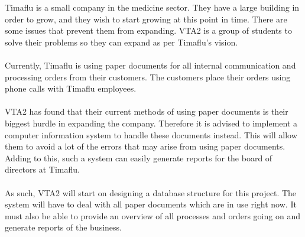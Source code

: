 \documentclass[11pt,english]{article}
\begin{document}
Timaflu is a small company in the medicine sector. They have a large building in
order to grow, and they wish to start growing at this point in time. There are
some issues that prevent them from expanding. VTA2 is a group of students to
solve their problems so they can expand as per Timaflu's vision.
\\ \\
Currently, Timaflu is using paper documents for all internal communication and
processing orders from their customers. The customers place their orders using
phone calls with Timaflu employees.
\\ \\
VTA2 has found that their current methods of using paper documents is their
biggest hurdle in expanding the company. Therefore it is advised to implement a
computer information system to handle these documents instead. This will allow
them to avoid a lot of the errors that may arise from using paper documents.
Adding to this, such a system can easily generate reports for the board of
directors at Timaflu.
\\ \\
As such, VTA2 will start on designing a database structure for this project. The
system will have to deal with all paper documents which are in use right now. It
must also be able to provide an overview of all processes and orders going on
and generate reports of the business.
\end{document}
